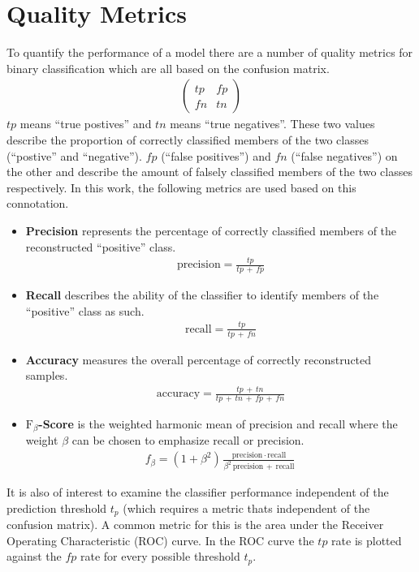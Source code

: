 \section{Quality Metrics}
\label{sec:quality_metrics}
To quantify the performance of a model there are a number of quality metrics for binary classification which are all based on the confusion matrix.
\begin{align}
    \begin{pmatrix}
        tp & fp \\
        fn & tn
    \end{pmatrix}
\end{align}
$tp$ means \enquote{true postives} and $tn$ means \enquote{true negatives}. 
These two values describe the proportion of correctly classified members of the two classes (\enquote{postive} and \enquote{negative}).
$fp$ (\enquote{false positives}) and $fn$ (\enquote{false negatives}) on the other and describe the amount of falsely classified members of the two classes respectively.
In this work, the following metrics are used based on this connotation.
\begin{itemize}
    \item \textbf{Precision} represents the percentage of correctly classified members of the reconstructed \enquote{positive} class.
        \begin{align}
            \text{precision} = \frac{tp}{tp\, +\, fp}
        \end{align}
    \item \textbf{Recall} describes the ability of the classifier to identify members of the \enquote{positive} class as such.
        \begin{align}
            \text{recall} = \frac{tp}{tp\, +\, fn}
        \end{align}
    \item \textbf{Accuracy} measures the overall percentage of correctly reconstructed samples.
        \begin{align}
            \text{accuracy} = \frac{tp\, +\, tn}{tp\, +\, tn\, +\, fp\, +\, fn}
        \end{align}
    \item \textbf{$\text{F}_\beta$-Score} is the weighted harmonic mean of precision and recall where the weight $\beta$ can be chosen to emphasize recall or precision.
        \begin{align}
            f_\beta = (1 + \beta^2) \frac{\text{precision}\, \cdot\, \text{recall}}{\beta^2\, \text{precision}\, +\, \text{recall}}
        \end{align}
\end{itemize}
It is also of interest to examine the classifier performance independent of the prediction threshold $t_p$ 
(which requires a metric thats independent of the confusion matrix).
A common metric for this is the area under the Receiver Operating Characteristic (ROC) curve.
In the ROC curve the $tp$ rate is plotted against the $fp$ rate for every possible threshold $t_p$.

